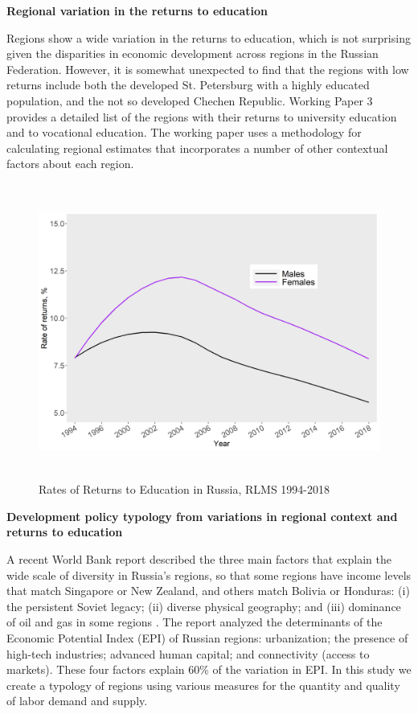 \documentclass[alpha-refs]{wiley-article-04t}
\begin{document}
\hspace{-2em} \textbf{Regional variation in the returns to 
education}

\vspace{1em}

\noindent Regions show a wide variation in the returns to education, which 
is not 
surprising given the disparities in economic development across regions in 
the Russian Federation.  However, it is somewhat unexpected to find  that 
the regions with low  returns include both the developed St. Petersburg 
with a highly educated population, and the not so developed Chechen 
Republic. Working Paper 3 provides a detailed list of the regions with 
their returns to university  education and to vocational education.  
The working paper uses a methodology for calculating regional estimates 
that incorporates a number of other contextual factors about each region.

\begin{figure}[htbp!]
	\centering
	\includegraphics[width=\textwidth, height=275pt]{re_edu2.png}
	\caption{Rates of Returns to Education in Russia, RLMS 
	1994-2018}\label{fig:1.2}
\end{figure}


\hspace{-2em} \textbf{Development policy typology from variations in 
regional context and returns to education}

\vspace{1em}


\noindent A recent World Bank report described the three main factors that 
explain 
the wide scale of diversity in Russia's regions, so that some regions 
have income levels that match Singapore or New Zealand, and others match 
Bolivia or Honduras: (i) the persistent Soviet legacy; (ii) diverse 
physical geography; and (iii) dominance of oil and gas in some regions 
\parencite{worldbank2018}. The report analyzed the determinants of the 
Economic Potential Index (EPI) of Russian regions: urbanization; the 
presence of high-tech industries; advanced human capital; 
and connectivity (access to markets). These four factors explain 60\% of 
the variation in EPI. In this study we create a typology of regions using 
various measures for the quantity and quality of labor demand and supply. 
\end{document}
